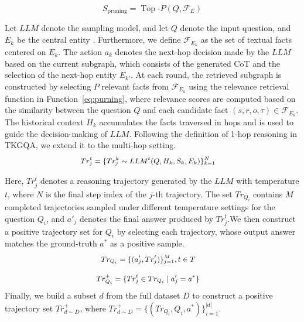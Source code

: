 \documentclass[letterpaper]{article} %
\begin{document}
\begin{equation}
S_{\text{pruning}} = \operatorname*{Top}\text{-}P(Q,\mathcal{F}_E)
\label{eq:purning}
\end{equation}
\noindent


Let $LLM$ denote the sampling model, and let $Q$ denote the input question, and $E_k$ be the  central entity . 
Furthermore, we define $\mathcal{F}_{E_k}$ as the set of textual facts centered on $E_k$.
The action $a_k$ denotes the next-hop decision made by the $LLM$ based on the current subgraph, which consists of the generated CoT and the selection of the next-hop entity $E_{k'}$.
At each round, the retrieved subgraph is constructed by selecting $P$ relevant facts from $\mathcal{F}_{E_k}$ using the relevance retrieval function in Function~\eqref{eq:purning}, where relevance scores are computed based on the similarity between the question $Q$ and each candidate fact $(s, r, o, \tau) \in \mathcal{F}_{E_k}$.
The historical context $H_k$ accumulates the facts traversed in hops and is used to guide the decision-making of $LLM$. 
Following the definition of 1-hop reasoning in TKGQA, we extend it to the multi-hop setting.
\begin{equation}  \small
	\begin{aligned}  
		& Tr_j^t = \{Tr_j^{k} \sim LLM^t(Q,H_{k},S_k,E_k)\}_{k=1}^N
	\end{aligned} 
    \label{tr.tr}
\end{equation} 


\noindent Here, $Tr_j^t$ denotes a reasoning trajectory generated by the $LLM$ with temperature $t$, where $N$ is the final step index of the $j$-th trajectory. The set $Tr_{Q_i}$ contains $M$ completed trajectories sampled under different temperature settings for the question $Q_i$, and $a'_j$ denotes the final answer produced by $Tr_j^t$.We then construct a positive trajectory set for $Q_i$ by selecting each trajectory, whose output answer matches the ground-truth $a^*$ as a positive sample. 
\begin{equation}  \small
	\begin{aligned}  
		& Tr_{Q_i} = \{(a'_j,Tr_j^t)\}_{j=1}^M,t\in T
	\end{aligned} 
    \label{tr.q}
\end{equation} 

\begin{equation}  \small
	\begin{aligned}  
		&  Tr_{Q_i}^+ = \{ Tr_j^t \in Tr_{Q_i} \mid a'_j = a^* \}
	\end{aligned} 
    \label{tr.q2}
\end{equation} 
Finally, we build a subset $d$ from the full dataset $D$ to construct a positive trajectory set $Tr_{d \sim D}^+$, 
where 
$Tr_{d \sim D}^+ = \{(Tr_{Q_i}, Q_i, a^*)\}_{i=1}^{|d|}$.
\end{document}
